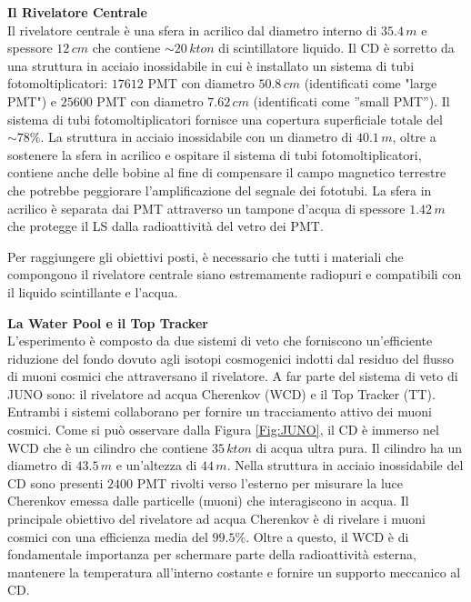\textbf{Il Rivelatore Centrale}\\
Il rivelatore centrale è una sfera in acrilico dal diametro interno di $35.4\,\unit{m}$ e spessore $12\,\unit{cm}$ che contiene $\sim20\,\unit{kton}$ di scintillatore liquido. Il CD è sorretto da una struttura in acciaio inossidabile in cui è installato un sistema di tubi fotomoltiplicatori: $17612$ PMT con diametro $50.8\,\unit{cm}$ (identificati come "large PMT") e $25600$ PMT con diametro $7.62\,\unit{cm}$ (identificati come ''small PMT''). Il sistema di tubi fotomoltiplicatori fornisce una copertura superficiale totale del $\sim78\%$.
 La struttura in acciaio inossidabile con un diametro di $40.1\,\unit{m}$, oltre a sostenere la sfera in acrilico e ospitare il sistema di tubi fotomoltiplicatori, contiene anche delle bobine al fine di compensare il campo magnetico terrestre che potrebbe peggiorare l'amplificazione del segnale dei fototubi. 
La sfera in acrilico è separata dai PMT attraverso un tampone d'acqua di spessore $1.42 \,\unit{m}$ che protegge il LS dalla radioattività del vetro dei PMT.

Per raggiungere gli obiettivi posti, è necessario che tutti i materiali che compongono il rivelatore centrale siano estremamente radiopuri e compatibili con il liquido scintillante e l'acqua.
\vspace{0,5cm}

\textbf{La Water Pool e il Top Tracker}\\%
L'esperimento è composto da due sistemi di veto che forniscono un'efficiente riduzione del fondo dovuto agli isotopi cosmogenici indotti dal residuo del flusso di muoni cosmici che attraversano il rivelatore.
A far parte del sistema di veto di JUNO sono: il rivelatore ad acqua Cherenkov (WCD) e il Top Tracker (TT). Entrambi i sistemi collaborano per fornire un tracciamento attivo dei muoni cosmici. Come si può osservare dalla Figura \ref{Fig:JUNO}, il CD è immerso nel WCD che è un cilindro che contiene $35\,\unit{kton}$ di acqua ultra pura. Il cilindro ha un diametro di $43.5\,\unit{m}$ e un'altezza di $44\,\unit{m}$. Nella struttura in acciaio inossidabile del CD sono presenti $2400$ PMT rivolti verso l'esterno per misurare la luce Cherenkov emessa dalle particelle (muoni) che interagiscono in acqua. Il principale obiettivo del rivelatore ad acqua Cherenkov è di rivelare i muoni cosmici con una efficienza media del $99.5\%$. Oltre a questo, il WCD è di fondamentale importanza per schermare parte della radioattività esterna, mantenere la temperatura all'interno costante e fornire un supporto meccanico al CD.

